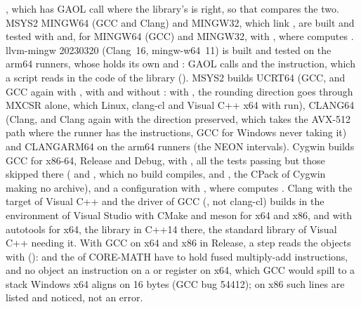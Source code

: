 , which has GAOL call 
where the library's  is right, so that  compares the
two. MSYS2 MINGW64 (GCC and Clang) and MINGW32, which link ,
are built and tested with  and, for MINGW64 (GCC) and MINGW32,
with , where  computes .
llvm-mingw 20230320 (Clang~16, mingw-w64~11) is built and tested on the arm64
runners, whose  holds its own  and :
GAOL calls  and the instruction, which a script reads in the
code of the library (). MSYS2 builds
UCRT64 (GCC, and GCC again with
, with and without : with
, the rounding direction goes through MXCSR alone, which
Linux, clang-cl and Visual C++ x64 with  run), CLANG64
(Clang, and Clang again with the direction preserved, which takes the
AVX-512 path where the runner has the instructions, GCC for Windows never
taking it) and CLANGARM64 on the arm64 runners (the NEON intervals). Cygwin
builds GCC for x86-64, Release and Debug, with
, all the tests passing but those skipped there ( and
, which no build compiles, and ,
the CPack of Cygwin making no archive), and a configuration with
, where  computes
.\newinvfive{} Clang with the target of Visual C++ and the driver of
GCC (, not clang-cl) builds in the environment of Visual Studio
with CMake and meson for x64 and x86, and with autotools for x64, the
library in C++14 there, the standard library of Visual C++ needing it. With
GCC on x64 and x86 in Release, a step reads the objects with 
():
 and the  of CORE-MATH
have to hold fused multiply-add
instructions, and no object an instruction on a  or  register on x64, which GCC would spill to a stack Windows x64 aligns on 16
bytes (GCC bug 54412); on x86 such lines are listed and noticed, not an error.

